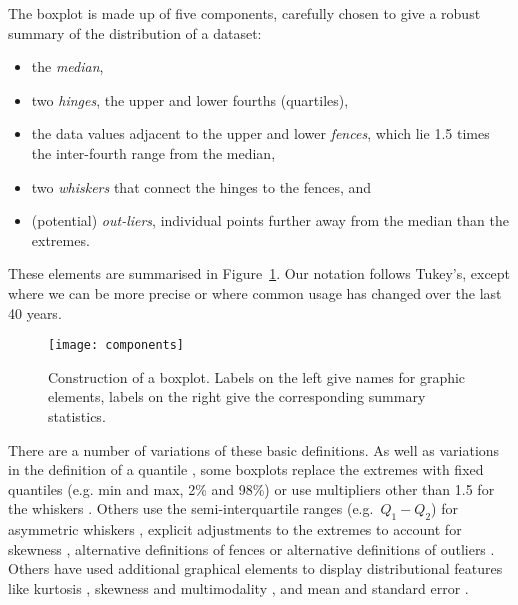 \documentclass[oneside]{article}
\begin{document}
The boxplot is made up of five components, carefully chosen to give a robust summary of the distribution of a dataset:

\begin{itemize}

\item the \emph{median},

\item two \emph{hinges}, the upper and lower fourths (quartiles),

\item the data values adjacent to the upper and lower \emph{fences}, which lie 1.5 times the inter-fourth range from the median,

\item two \emph{whiskers} that connect the hinges to the fences, and

\item (potential) \emph{out-liers}, individual points further away from the median than the extremes.

\end{itemize}

\noindent These elements are summarised in Figure~\ref{fig:construction}. Our notation follows Tukey's, except where we can be more precise or where common usage has changed over the last 40 years. 

\begin{figure}[htbp]
  \centering
  \texttt{[image: components]}
  \caption{Construction of a boxplot.  Labels on the left give names for graphic elements, labels on the right give the corresponding summary statistics.}
  \label{fig:construction}
\end{figure}

There are a number of variations of these basic definitions. As well as variations in the definition of a quantile \citep{hyndman:1996}, some boxplots replace the extremes with fixed quantiles (e.g. min and max, 2\% and 98\%) or use multipliers other than 1.5 for the whiskers \citep{frigge:1989}. Others use the semi-interquartile ranges (e.g.\ $Q_1 - Q_2$) for asymmetric whiskers \citep{rousseuw:1999}, explicit adjustments to the extremes to account for skewness \citep{hubert:2008}, alternative definitions of fences \citep{dumbgen:2007} or alternative definitions of outliers \citep{schwertman:2004,carter:2009}. Others have used additional graphical elements to display distributional features like kurtosis \citep{aslam:1991}, skewness and multimodality \citep{choonpradub:2005}, and mean and standard error \citep{marmolejo-ramos:2010}.
\end{document}

